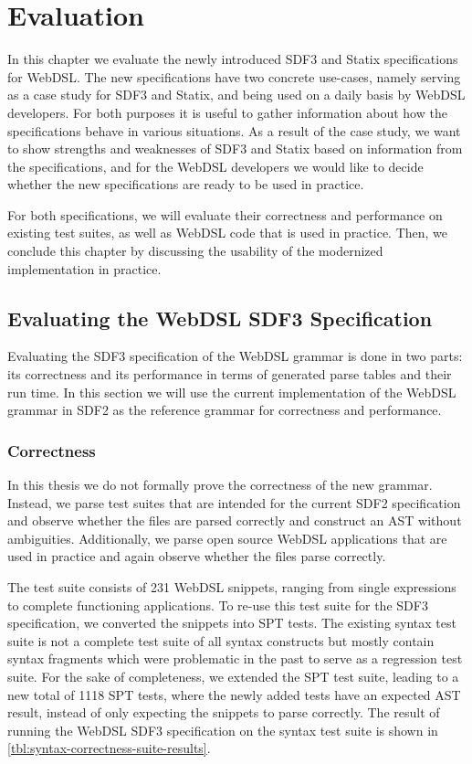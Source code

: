 
\chapter{\label{chap:evaluation}Evaluation}

In this chapter we evaluate the newly introduced SDF3 and Statix specifications for WebDSL. The new specifications have two concrete use-cases, namely serving as a case study for SDF3 and Statix, and being used on a daily basis by WebDSL developers. For both purposes it is useful to gather information about how the specifications behave in various situations. As a result of the case study, we want to show strengths and weaknesses of SDF3 and Statix based on information from the specifications, and for the WebDSL developers we would like to decide whether the new specifications are ready to be used in practice.

For both specifications, we will evaluate their correctness and performance on existing test suites, as well as WebDSL code that is used in practice. Then, we conclude this chapter by discussing the usability of the modernized implementation in practice.

\section{\label{sec:eval-sdf3}Evaluating the WebDSL SDF3 Specification}

  Evaluating the SDF3 specification of the WebDSL grammar is done in two parts: its correctness and its performance in terms of generated parse tables and their run time. In this section we will use the current implementation of the WebDSL grammar in SDF2 as the reference grammar for correctness and performance.

  \subsection{Correctness}

    In this thesis we do not formally prove the correctness of the new grammar. Instead, we parse test suites that are intended for the current SDF2 specification and observe whether the files are parsed correctly and construct an AST without ambiguities. Additionally, we parse open source WebDSL applications that are used in practice and again observe whether the files parse correctly.

    The test suite consists of 231 WebDSL snippets, ranging from single expressions to complete functioning applications. To re-use this test suite for the SDF3 specification, we converted the snippets into SPT tests. The existing syntax test suite is not a complete test suite of all syntax constructs but mostly contain syntax fragments which were problematic in the past to serve as a regression test suite. For the sake of completeness, we extended the SPT test suite, leading to a new total of 1118 SPT tests, where the newly added tests have an expected AST result, instead of only expecting the snippets to parse correctly. The result of running the WebDSL SDF3 specification on the syntax test suite is shown in \cref{tbl:syntax-correctness-suite-results}.

